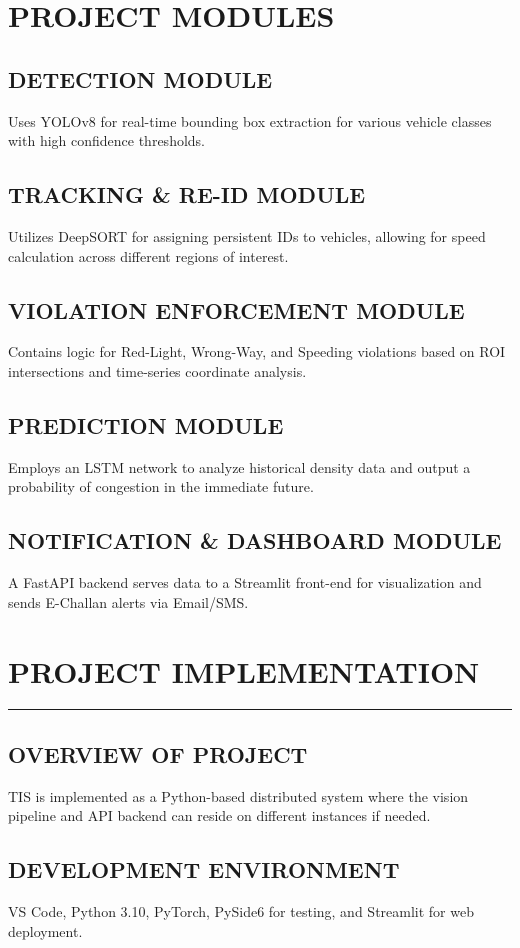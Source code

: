 \documentclass[12pt,times,a4paper]{report}
\newcommand\HRule{\rule{\textwidth}{1pt}}
\begin{document}
\chapter{PROJECT MODULES}
\section{DETECTION MODULE}
Uses YOLOv8 for real-time bounding box extraction for various vehicle classes with high confidence thresholds.
\section{TRACKING & RE-ID MODULE}
Utilizes DeepSORT for assigning persistent IDs to vehicles, allowing for speed calculation across different regions of interest.
\section{VIOLATION ENFORCEMENT MODULE}
Contains logic for Red-Light, Wrong-Way, and Speeding violations based on ROI intersections and time-series coordinate analysis.
\section{PREDICTION MODULE}
Employs an LSTM network to analyze historical density data and output a probability of congestion in the immediate future.
\section{NOTIFICATION & DASHBOARD MODULE}
A FastAPI backend serves data to a Streamlit front-end for visualization and sends E-Challan alerts via Email/SMS.

\chapter{PROJECT IMPLEMENTATION}
\HRule
\section{OVERVIEW OF PROJECT}
TIS is implemented as a Python-based distributed system where the vision pipeline and API backend can reside on different instances if needed.
\section{DEVELOPMENT ENVIRONMENT}
VS Code, Python 3.10, PyTorch, PySide6 for testing, and Streamlit for web deployment.
\end{document}
